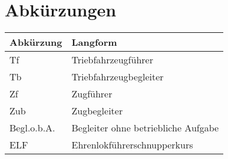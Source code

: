 \chapter{Abkürzungen}
\begin{tabularx}{\textwidth}{l|X}
  Abkürzung & Langform \\
  \hline
  \hline
  Tf & Triebfahrzeugführer \\
  \hline
  Tb & Triebfahrzeugbegleiter \\
  \hline
  Zf & Zugführer \\
  \hline
  Zub	& Zugbegleiter \\
  \hline
  Begl.o.b.A. & Begleiter ohne betriebliche Aufgabe \\
  \hline
  ELF &	Ehrenlokführerschnupperkurs \\
\end{tabularx}
